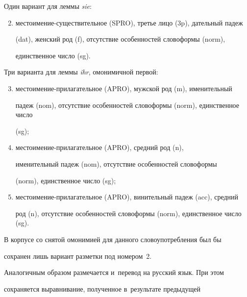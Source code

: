   Один вариант для леммы \textit{sie}:


  \begin{enumerate}[(1)]


  \setcounter{enumi}{1}


\item местоимение-существительное (SPRO), третье лицо (3p), дательный падеж 


(dat), женский род (f), отсутствие особенностей словоформы (norm), 


единственное число (sg).


\end{enumerate}





  Три варианта для леммы \textit{ihr}, омонимичной первой:


  \begin{enumerate}[(1)]


    \setcounter{enumi}{2}


\item местоимение-прилагательное (APRO), мужской род (m), именительный 


падеж (nom), отсутствие особенностей словоформы (norm), единственное число 


(sg);


\item местоимение-прилагательное (APRO), средний род (n), 


именительный падеж (nom), отсутствие особенностей словоформы 


(norm), единственное число (sg);


\item местоимение-прилагательное (APRO), винительный падеж (acc), средний 


род (n), отсутствие особенностей словоформы (norm), единственное число (sg).


\end{enumerate}





  В корпусе со снятой омонимией для данного словоупотребления был бы 


сохранен лишь вариант разметки под номером~2.


  


  Аналогичным образом размечается и~перевод на русский язык. При этом 


сохраняется выравнивание, полученное в~результате предыдущей 


